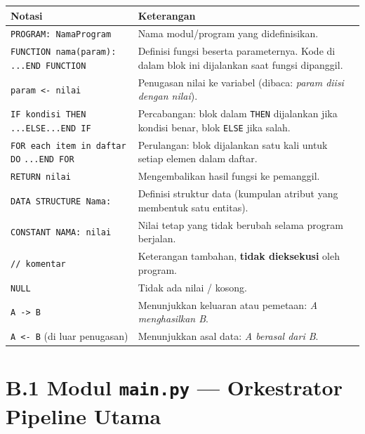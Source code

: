 \begin{center}
\renewcommand{\arraystretch}{1.3}
\begin{tabular}{|p{5.5cm}|p{9cm}|}
\hline
\textbf{Notasi} & \textbf{Keterangan} \\
\hline
\texttt{PROGRAM: NamaProgram} &
  Nama modul/program yang didefinisikan. \\
\hline
\texttt{FUNCTION nama(param):} \newline
\texttt{...END FUNCTION} &
  Definisi fungsi beserta parameternya. Kode di dalam blok ini dijalankan
  saat fungsi dipanggil. \\
\hline
\texttt{param <- nilai} &
  Penugasan nilai ke variabel (dibaca: \textit{param diisi dengan nilai}). \\
\hline
\texttt{IF kondisi THEN} \newline
\texttt{...ELSE...END IF} &
  Percabangan: blok dalam \texttt{THEN} dijalankan jika kondisi benar,
  blok \texttt{ELSE} jika salah. \\
\hline
\texttt{FOR each item in daftar DO} \newline
\texttt{...END FOR} &
  Perulangan: blok dijalankan satu kali untuk setiap elemen dalam daftar. \\
\hline
\texttt{RETURN nilai} &
  Mengembalikan hasil fungsi ke pemanggil. \\
\hline
\texttt{DATA STRUCTURE Nama:} &
  Definisi struktur data (kumpulan atribut yang membentuk satu entitas). \\
\hline
\texttt{CONSTANT NAMA: nilai} &
  Nilai tetap yang tidak berubah selama program berjalan. \\
\hline
\texttt{// komentar} &
  Keterangan tambahan, \textbf{tidak dieksekusi} oleh program. \\
\hline
\texttt{NULL} &
  Tidak ada nilai / kosong. \\
\hline
\texttt{A -> B} &
  Menunjukkan keluaran atau pemetaan: \textit{A menghasilkan B}. \\
\hline
\texttt{A <- B} (di luar penugasan) &
  Menunjukkan asal data: \textit{A berasal dari B}. \\
\hline
\end{tabular}
\end{center}

\bigskip

\section*{B.1 Modul \texttt{main.py} --- Orkestrator Pipeline Utama}

